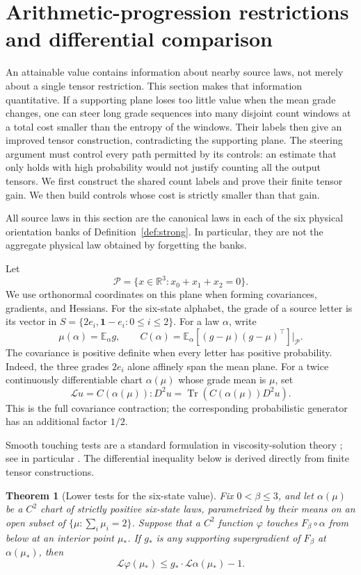 \documentclass[11pt]{article}
\numberwithin{equation}{section}
\newtheorem{theorem}{Theorem}[section]
\theoremstyle{definition}
\theoremstyle{remark}
\newcommand{\R}{\mathbb R}
\newcommand{\E}{\mathbb E}
\DeclareMathOperator{\Tr}{Tr}
\begin{document}
\section{Arithmetic-progression restrictions and differential comparison}
\label{ap:section}

An attainable value contains information about nearby source laws, not merely
about a single tensor restriction.  This section makes that information
quantitative.  If a supporting plane loses too little value when the mean
grade changes, one can steer long grade sequences into many disjoint count
windows at a total cost smaller than the entropy of the windows.  Their
labels then give an improved tensor construction, contradicting the supporting
plane.  The steering argument must control every path permitted by its controls:
an estimate that only holds with high probability would not justify counting
all the output tensors.  We first construct the shared count labels and
prove their finite tensor gain.  We then build controls whose cost is
strictly smaller than that gain.

All source laws in this section are the canonical laws in each of the six
physical orientation banks of Definition~\ref{def:strong}.  In particular,
they are not the aggregate physical law obtained by forgetting the banks.

Let
\[
 \mathcal P=\{x\in\R^3:x_0+x_1+x_2=0\}.
\]
We use orthonormal coordinates on this plane when forming covariances,
gradients, and Hessians.  For the six-state alphabet, the grade of a source
letter is its vector in
\(S=\{2e_i,\boldsymbol 1-e_i:0\leq i\leq2\}\).
For a law \(\alpha\), write
\[
 \mu(\alpha)=\E_\alpha g,
 \qquad
 C(\alpha)=\E_\alpha[(g-\mu)(g-\mu)^\top]\big|_{\mathcal P}.
\]
The covariance is positive definite when every letter has positive
probability.  Indeed, the three grades \(2e_i\) alone affinely span the mean
plane.  For a twice continuously differentiable chart \(\alpha(\mu)\)
whose grade mean is \(\mu\), set
\[
 \mathcal L u=C(\alpha(\mu)):D^2u
              =\Tr(C(\alpha(\mu))D^2u).
\]
This is the full covariance contraction; the corresponding probabilistic
generator has an additional factor \(1/2\).

Smooth touching tests are a standard formulation in viscosity-solution
theory \cite{crandalllions1983}; see in particular
\cite[Section~2]{crandallishiilions1992}.  The differential inequality
below is derived directly from finite tensor constructions.

\begin{theorem}[Lower tests for the six-state value]\label{thm:ap}
Fix \(0<\beta\leq3\), and let \(\alpha(\mu)\) be a \(C^2\) chart of
strictly positive six-state laws, parametrized by their means on an open
subset of \(\{\mu:\sum_i\mu_i=2\}\).  Suppose that a \(C^2\) function
\(\varphi\) touches \(F_\beta\circ\alpha\) from below at an interior
point \(\mu_*\).  If \(g_*\) is any supporting supergradient of
\(F_\beta\) at \(\alpha(\mu_*)\), then
\begin{equation}\label{ap:lower-test}
 \mathcal L\varphi(\mu_*)
 \leq g_*\cdot\mathcal L\alpha(\mu_*)-1.
\end{equation}
\end{theorem}
\end{document}
